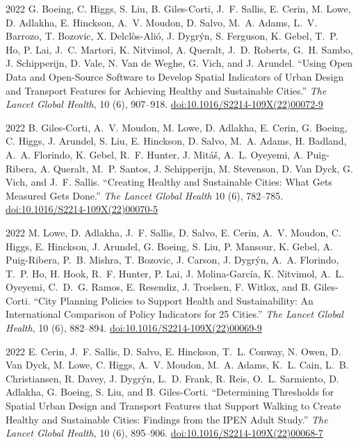 \documentclass[11pt,letterpaper]{report}
\begin{document}
\begin{tablist}
        \item[2022] \tab{}G. Boeing, C. Higgs, S. Liu, B. Giles-Corti, J.~F. Sallis, E. Cerin, M. Lowe, D. Adlakha, E. Hinckson, A.~V. Moudon, D. Salvo, M.~A. Adams, L.~V. Barrozo, T. Bozovic, X. Delclòs-Alió, J. Dygrýn, S. Ferguson, K. Gebel, T.~P. Ho, P. Lai, J.~C. Martori, K. Nitvimol, A. Queralt, J.~D. Roberts, G.~H. Sambo, J. Schipperijn, D. Vale, N. Van de Weghe, G. Vich, and J. Arundel. \enquote{Using Open Data and Open-Source Software to Develop Spatial Indicators of Urban Design and Transport Features for Achieving Healthy and Sustainable Cities.} \textit{The Lancet Global Health}, 10 (6), 907--918. \href{https://doi.org/10.1016/S2214-109X(22)00072-9}{doi:10.1016/S2214-109X(22)00072-9}

        \item[2022] \tab{}B. Giles-Corti, A.~V. Moudon, M. Lowe, D. Adlakha, E. Cerin, G. Boeing, C. Higgs, J. Arundel, S. Liu, E. Hinckson, D. Salvo, M.~A. Adams, H. Badland, A.~A. Florindo, K. Gebel, R.~F. Hunter, J. Mitáš, A.~L. Oyeyemi, A. Puig-Ribera, A. Queralt, M.~P. Santos, J. Schipperijn, M. Stevenson, D. Van Dyck, G. Vich, and J.~F. Sallis. \enquote{Creating Healthy and Sustainable Cities: What Gets Measured Gets Done.} \textit{The Lancet Global Health} 10 (6), 782--785. \href{https://doi.org/10.1016/S2214-109X(22)00070-5}{doi:10.1016/S2214-109X(22)00070-5}

        \item[2022] \tab{}M. Lowe, D. Adlakha, J.~F. Sallis, D. Salvo, E. Cerin, A.~V. Moudon, C. Higgs, E. Hinckson, J. Arundel, G. Boeing, S. Liu, P. Mansour, K. Gebel, A. Puig-Ribera, P.~B. Mishra, T. Bozovic, J. Carson, J. Dygrýn, A.~A. Florindo, T.~P. Ho, H. Hook, R.~F. Hunter, P. Lai, J. Molina-García, K. Nitvimol, A.~L. Oyeyemi, C.~D.~G. Ramos, E. Resendiz, J. Troelsen, F. Witlox, and B. Giles-Corti. \enquote{City Planning Policies to Support Health and Sustainability: An International Comparison of Policy Indicators for 25 Cities.}  \textit{The Lancet Global Health}, 10 (6), 882--894. \href{https://doi.org/10.1016/S2214-109X(22)00069-9}{doi:10.1016/S2214-109X(22)00069-9}

        \item[2022] \tab{}E. Cerin, J.~F. Sallis, D. Salvo, E. Hinckson, T.~L. Conway, N. Owen, D. Van Dyck, M. Lowe, C. Higgs, A.~V. Moudon, M.~A. Adams, K.~L. Cain, L.~B. Christiansen, R. Davey, J. Dygrýn, L.~D. Frank, R. Reis, O.~L. Sarmiento, D. Adlakha, G. Boeing, S. Liu, and B. Giles-Corti. \enquote{Determining Thresholds for Spatial Urban Design and Transport Features that Support Walking to Create Healthy and Sustainable Cities: Findings from the IPEN Adult Study.}  \textit{The Lancet Global Health}, 10 (6), 895--906. \href{https://doi.org/10.1016/S2214-109X(22)00068-7}{doi:10.1016/S2214-109X(22)00068-7}


\end{tablist}
\end{document}
